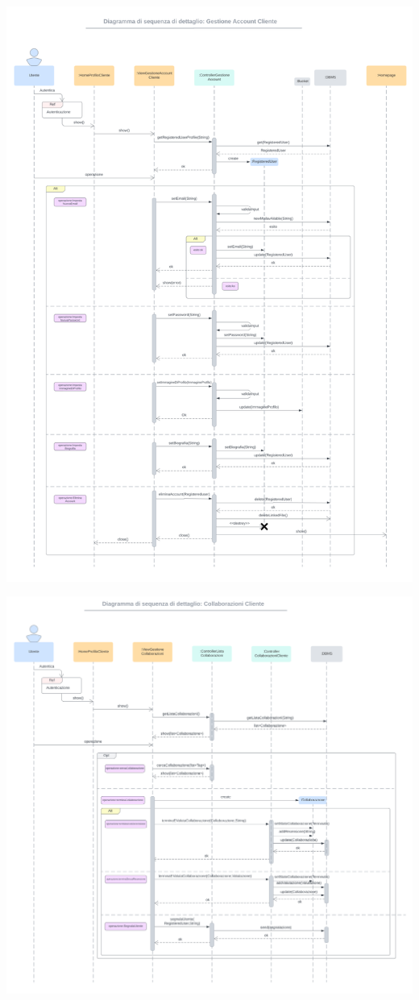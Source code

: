 \includegraphics[width=1\textwidth]{assets/img/sequenza_dettaglio/cliente-1.png}\\

\newpage

\includegraphics[width=1\textwidth]{assets/img/sequenza_dettaglio/cliente-2.png}\\